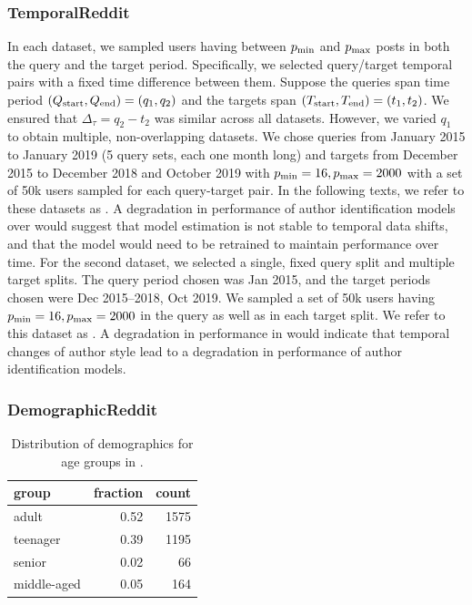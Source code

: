 \subsubsection{TemporalReddit} 
In each dataset, we sampled users having between $p_{\rm{min}}$ and $p_{\rm{max}}$ posts in both the query and the target period. 
Specifically, we selected query/target temporal pairs with a fixed time difference between them.
Suppose the queries span time period $(Q_{\rm{start}}, Q_{\rm{end}}) = (q_1, q_2)$ and the targets span $(T_{\rm{start}}, T_{\rm{end}}) = (t_1, t_2)$.
We ensured that $\Delta_\tau = q_2 - t_2$ was similar across all datasets. 
However, we varied $q_1$ to obtain multiple, non-overlapping datasets.
We chose queries from January 2015 to January 2019 (5 query sets, each one month long) and targets from December 2015 to December 2018 and October 2019 with $p_{\rm{min}} = 16, p_{\rm{max}} = 2000$ with a set of 50k users sampled for each query-target pair.
In the following texts, we refer to these datasets as \DSfixeddelta{}.
A degradation in performance of author identification models over \DSfixeddelta{} would suggest that model estimation is not stable to temporal data shifts, and that the model would need to be retrained to maintain performance over time.
For the second dataset, we selected a single, fixed query split and multiple target splits. 
The query period chosen was Jan 2015, and the target periods chosen were Dec 2015--2018, Oct 2019. 
We sampled a set of 50k users having $p_{\rm{min}} = 16, p_{\rm{max}} = 2000$ in the query as well as in each target split.
We refer to this dataset as \DSvarydelta{}. 
A degradation in performance in \DSvarydelta{} would indicate that temporal changes of author style lead to a degradation in performance of author identification models.

\subsubsection{DemographicReddit}

\begin{table}[h]
    \centering
    \begin{tabular}{lrr}
    \toprule
    group & fraction & count \\
    \midrule
    adult & 0.52 & 1575 \\
    teenager & 0.39 & 1195 \\
    senior & 0.02 & 66 \\
    middle-aged & 0.05 & 164 \\
    \bottomrule
    \end{tabular}
    \caption{Distribution of demographics for age groups in \DSagefixed{}.}
    \label{tab:demographics:age_dist}
\end{table}

